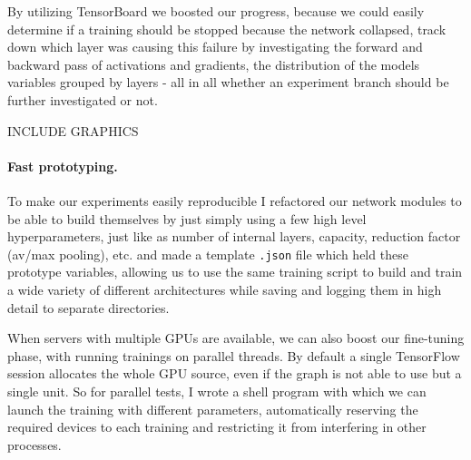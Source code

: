 \begin{figure}
  \centering
  \begin{floatrow}
  \end{floatrow}
  \label{fig:tf-score}
\end{figure}

By utilizing TensorBoard we boosted our progress, because we could easily determine if a training should be stopped because the network collapsed, track down which layer was causing this failure by investigating the forward and backward pass of activations and gradients, the distribution of the models variables grouped by layers - all in all whether an experiment branch should be further investigated or not.

INCLUDE GRAPHICS

\paragraph{Fast prototyping.}
To make our experiments easily reproducible I refactored our network modules to be able to build themselves by just simply using a few high level hyperparameters, just like as number of internal layers, capacity, reduction factor (av/max pooling), etc. and made a template \texttt{.json} file which held these prototype variables, allowing us to use the same training script to build and train a wide variety of different architectures while saving and logging them in high detail to separate directories.

When servers with multiple GPUs are available, we can also boost our fine-tuning phase, with running trainings on parallel threads.
By default a single TensorFlow session allocates the whole GPU source, even if the graph is not able to use but a single unit.
So for parallel tests, I wrote a shell program with which we can launch the training with different parameters, automatically reserving the required devices to each training and restricting it from interfering in other processes.
